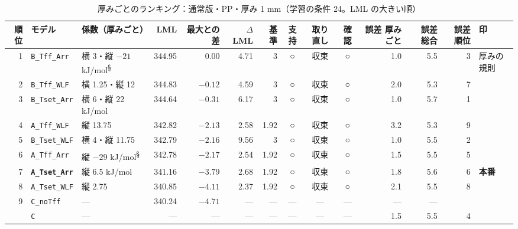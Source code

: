 \documentclass[paper=a4paper,landscape,fontsize=10pt,line_length=62zw,number_of_lines=34]{jlreq}
\let\origtextbf\textbf
\renewcommand{\textbf}[1]{\origtextbf{\gtfamily #1}}   %
\begin{document}
\begin{table}[H]\centering\footnotesize
\caption{厚みごとのランキング：通常版・PP・厚み 1 mm（学習の条件 24。LML の大きい順）}
\begin{tabular}{rlp{11\zw}rrrrccc rrrl}
\toprule
順位 & モデル & 係数（厚みごと） & LML & 最大との差 & $\Delta$LML & 基準 & 支持 & 取り直し & 確認 & 誤差 厚みごと & 誤差 総合 & 誤差順位 & 印 \\
\midrule
1 & \texttt{B\_\allowbreak{}Tff\_\allowbreak{}Arr} & 横 3・縦 $-21$ kJ/mol\textsuperscript{§} & 344.95 & 0.00 & 4.71 & 3 & ○ & 収束 & ○ & 1.0 & 5.5 & 3 & 厚みの規則 \\
2 & \texttt{B\_\allowbreak{}Tff\_\allowbreak{}WLF} & 横 1.25・縦 12 & 344.83 & $-0.12$ & 4.59 & 3 & ○ & 収束 & ○ & 2.0 & 5.3 & 7 &  \\
3 & \texttt{B\_\allowbreak{}Tset\_\allowbreak{}Arr} & 横 6・縦 22 kJ/mol & 344.64 & $-0.31$ & 6.17 & 3 & ○ & 収束 & ○ & 1.0 & 5.7 & 1 &  \\
4 & \texttt{A\_\allowbreak{}Tff\_\allowbreak{}WLF} & 縦 13.75 & 342.82 & $-2.13$ & 2.58 & 1.92 & ○ & 収束 & ○ & 3.2 & 5.3 & 9 &  \\
5 & \texttt{B\_\allowbreak{}Tset\_\allowbreak{}WLF} & 横 4・縦 11.75 & 342.79 & $-2.16$ & 9.56 & 3 & ○ & 収束 & ○ & 1.0 & 5.5 & 2 &  \\
6 & \texttt{A\_\allowbreak{}Tff\_\allowbreak{}Arr} & 縦 $-29$ kJ/mol\textsuperscript{§} & 342.78 & $-2.17$ & 2.54 & 1.92 & ○ & 収束 & ○ & 1.5 & 5.5 & 5 &  \\
7 & \textbf{\texttt{A\_\allowbreak{}Tset\_\allowbreak{}Arr}} & 縦 6.5 kJ/mol & 341.16 & $-3.79$ & 2.68 & 1.92 & ○ & 収束 & ○ & 1.8 & 5.6 & 6 & \textbf{本番} \\
8 & \texttt{A\_\allowbreak{}Tset\_\allowbreak{}WLF} & 縦 2.75 & 340.85 & $-4.11$ & 2.37 & 1.92 & ○ & 収束 & ○ & 2.1 & 5.5 & 8 &  \\
9 & \texttt{C\_\allowbreak{}noTff} & --- & 340.24 & $-4.71$ & --- & --- & --- & --- & --- & --- & --- &  &  \\
 & \texttt{C} & --- & --- & --- & --- & --- & --- & --- & --- & 1.5 & 5.5 & 4 &  \\
\bottomrule
\end{tabular}
\end{table}
\end{document}

